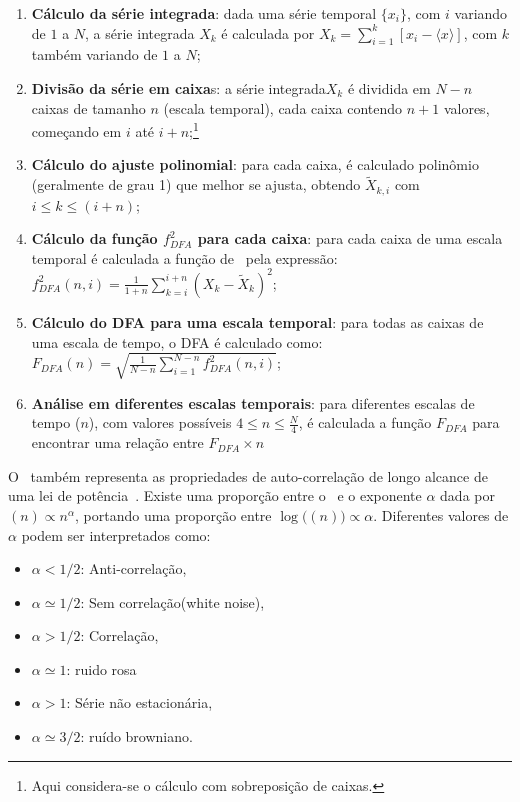\begin{enumerate}
\label{list:dfa}
\item \textbf{Cálculo da série integrada}: dada uma série temporal $\{x_{i}\}$, com $i$ variando de $1$ a $N$, a série integrada $X_{k}$ é calculada por $X_{k} = \sum_{i=1}^{k}\left[x_{i} - \langle x \rangle \right]$, com $k$ também variando de $1$ a $N$;
\item \textbf{Divisão da série em caixa}s: a série integrada$X_{k}$ é dividida em $N - n$ caixas de tamanho $n$ (escala temporal), cada caixa contendo $n + 1$ valores, começando em $i$ até $i + n$;\footnote{Aqui considera-se o cálculo com sobreposição de caixas.}
\item \textbf{Cálculo do ajuste polinomial}: para cada caixa, é calculado polinômio (geralmente de grau 1) que melhor se ajusta, obtendo $\widetilde{X}_{k, i}$ com $i \le k \le (i + n)$;
\item \textbf{Cálculo da função $f_{DFA}^{2}$ para cada caixa}: para cada caixa de uma escala temporal é calculada a função de \dfa~pela expressão:\\[10pt]
 $f_{DFA}^{2}(n, i) = \frac{1}{1+n} \sum_{k=i}^{i + n}(X_{k}-\widetilde{X}_{k})^{2}$;
\item \textbf{Cálculo do DFA para uma escala temporal}: para todas as caixas de uma escala de tempo, o DFA é calculado como: \\[10pt]
        $F_{DFA}(n) = \sqrt{\frac{1}{N - n} \sum_{i=1}^{N-n} f_{DFA}^{2}(n, i)}$;
\item \textbf{Análise em diferentes escalas temporais}: para diferentes escalas de tempo ($n$), com valores possíveis $4 \le n \le \frac{N}{4}$, é calculada a função $F_{DFA}$ para encontrar uma relação entre $F_{DFA} \times n$
  \end{enumerate}

O \dfa~também  representa as propriedades de auto-correlação de longo alcance de uma lei de potência~\cite{Zebende2013}. Existe uma proporção entre o \dfa~e o exponente $\alpha$ dada por \fdfa$(n) \propto n^\alpha$, portando uma proporção entre $\log($\fdfa$(n)) \propto \alpha$. Diferentes valores de $\alpha$ podem ser interpretados como:

\begin{itemize}
\item $\alpha < 1/2$: Anti-correlação,
\item $\alpha \simeq 1/2$: Sem correlação(white noise),
\item $\alpha > 1/2$: Correlação,
\item $\alpha \simeq 1$: ruido rosa
\item $\alpha > 1$: Série não estacionária,
\item $\alpha \simeq 3/2$: ruído browniano.
\end{itemize}

